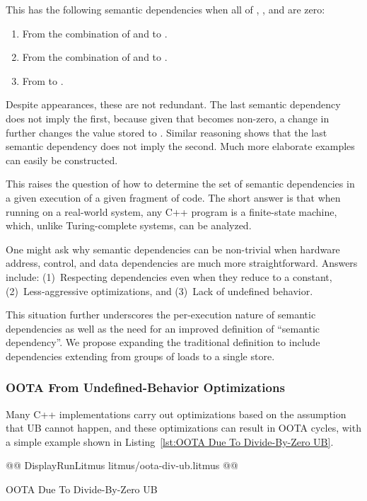 \documentclass[10]{article}
\begin{document}
This has the following semantic dependencies when all of ,
, and  are zero:

\begin{enumerate}
\item	From the combination of  and  to .
\item	From the combination of  and  to .
\item	From  to .
\end{enumerate}

Despite appearances, these are not redundant.
The last semantic dependency does not imply the first, because given
that  becomes non-zero, a change in  further changes
the value stored to .
Similar reasoning shows that the last semantic dependency does not
imply the second.
Much more elaborate examples can easily be constructed.

This raises the question of how to determine the set of semantic
dependencies in a given execution of a given fragment of code.
The short answer is that when running on a real-world system, 
any C++ program is a finite-state machine, which, unlike Turing-complete
systems, can be analyzed.

One might ask why semantic dependencies can be non-trivial when hardware
address, control, and data dependencies are much more straightforward.
Answers include:
(1)~Respecting dependencies even when they reduce to a constant,
(2)~Less-aggressive optimizations, and
(3)~Lack of undefined behavior.

This situation further underscores the per-execution nature of semantic
dependencies as well as the need for an improved definition of ``semantic
dependency''.
We propose expanding the traditional definition to include dependencies
extending from groups of loads to a single store.

\subsubsection{OOTA From Undefined-Behavior Optimizations}
\label{app:OOTA From Undefined-Behavior Optimizations}

Many C++ implementations carry out optimizations based on the assumption
that UB cannot happen, and these optimizations can result in OOTA cycles,
with a simple example shown in
Listing~\ref{lst:OOTA Due To Divide-By-Zero UB}.

\begin{listing}[tbp]
@@ DisplayRunLitmus litmus/oota-div-ub.litmus @@
\caption{OOTA Due To Divide-By-Zero UB}
\label{lst:OOTA Due To Divide-By-Zero UB}
\end{listing}
\end{document}
